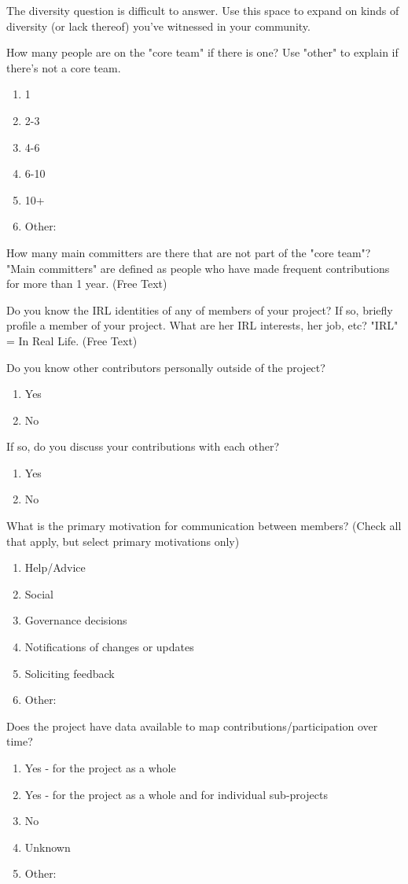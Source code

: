 The diversity question is difficult to answer. Use this space to expand on kinds of diversity (or lack thereof) you've witnessed in your community.

How many people are on the "core team" if there is one? Use "other" to explain if there's not a core team.
\begin{enumerate}
\item 1
\item 2-3
\item 4-6
\item 6-10
\item 10+
\item Other:
\end{enumerate}

How many main committers are there that are not part of the "core team"? "Main committers" are defined as people who have made frequent contributions for more than 1 year. (Free Text)

Do you know the IRL identities of any of members of your project? If so, briefly profile a member of your project. What are her IRL interests, her job, etc? "IRL" = In Real Life. (Free Text)

Do you know other contributors personally outside of the project?
\begin{enumerate}
\item Yes
\item No
\end{enumerate}

If so, do you discuss your contributions with each other?
\begin{enumerate}
\item Yes
\item No
\end{enumerate}

What is the primary motivation for communication between members? (Check all that apply, but select primary motivations only)
\begin{enumerate}
\item Help/Advice
\item Social
\item Governance decisions
\item Notifications of changes or updates
\item Soliciting feedback
\item Other:
\end{enumerate}

Does the project have data available to map contributions/participation over time?
\begin{enumerate}
\item Yes - for the project as a whole
\item Yes - for the project as a whole and for individual sub-projects
\item No
\item Unknown
\item Other:
\end{enumerate}

